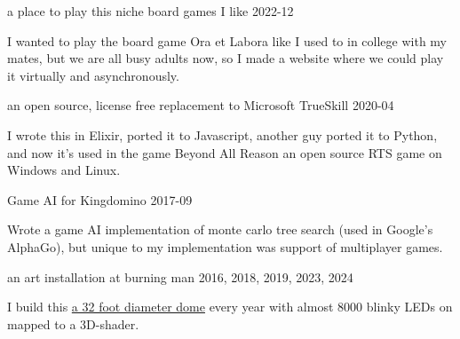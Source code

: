 \documentclass[11pt,english]{article}
\begin{document}
\begin{description}
\squish

           {a place to play this niche board games I like}
           {2022-12}

I wanted to play the board game Ora et Labora like I used to in college with my mates, but we are all busy adults now, so I made a website where we could play it virtually and asynchronously.

           {an open source, license free replacement to Microsoft TrueSkill}
           {2020-04}

I wrote this in Elixir, ported it to Javascript, another guy ported it to Python, and now it's used in the game Beyond All Reason an open source RTS game on Windows and Linux.

           {Game AI for Kingdomino}
           {2017-09}

Wrote a game AI implementation of monte carlo tree search (used in
Google's AlphaGo), but unique to my implementation was support of multiplayer games.

           {an art installation at burning man}
           {2016, 2018, 2019, 2023, 2024}

I build this \href{https://www.instagram.com/p/B2CdlKqnNXD/}{a 32 foot diameter dome} every year with almost 8000 blinky LEDs on mapped to a 3D-shader.

\end{description}
\end{document}
